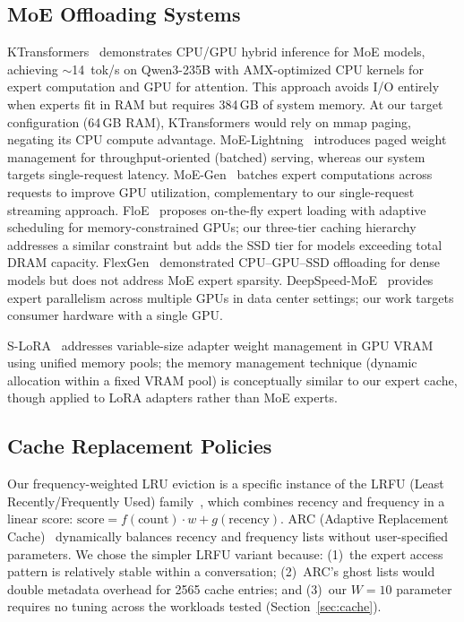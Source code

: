 \documentclass[11pt]{article}
\begin{document}
\subsection{MoE Offloading Systems}

KTransformers~\cite{ktransformers} demonstrates CPU/GPU hybrid inference for MoE models, achieving $\sim$14~tok/s on Qwen3-235B with AMX-optimized CPU kernels for expert computation and GPU for attention. This approach avoids I/O entirely when experts fit in RAM but requires 384\,GB of system memory. At our target configuration (64\,GB RAM), KTransformers would rely on mmap paging, negating its CPU compute advantage. MoE-Lightning~\cite{moelightning} introduces paged weight management for throughput-oriented (batched) serving, whereas our system targets single-request latency. MoE-Gen~\cite{moegen} batches expert computations across requests to improve GPU utilization, complementary to our single-request streaming approach. FloE~\cite{floe} proposes on-the-fly expert loading with adaptive scheduling for memory-constrained GPUs; our three-tier caching hierarchy addresses a similar constraint but adds the SSD tier for models exceeding total DRAM capacity. FlexGen~\cite{flexgen} demonstrated CPU--GPU--SSD offloading for dense models but does not address MoE expert sparsity. DeepSpeed-MoE~\cite{deepspeedmoe} provides expert parallelism across multiple GPUs in data center settings; our work targets consumer hardware with a single GPU.

S-LoRA~\cite{slora} addresses variable-size adapter weight management in GPU VRAM using unified memory pools; the memory management technique (dynamic allocation within a fixed VRAM pool) is conceptually similar to our expert cache, though applied to LoRA adapters rather than MoE experts.

\subsection{Cache Replacement Policies}

Our frequency-weighted LRU eviction is a specific instance of the LRFU (Least Recently/Frequently Used) family~\cite{lrfu}, which combines recency and frequency in a linear score: $\text{score} = f(\text{count}) \cdot w + g(\text{recency})$. ARC (Adaptive Replacement Cache)~\cite{arc} dynamically balances recency and frequency lists without user-specified parameters. We chose the simpler LRFU variant because: (1)~the expert access pattern is relatively stable within a conversation; (2)~ARC's ghost lists would double metadata overhead for 2565 cache entries; and (3)~our $W=10$ parameter requires no tuning across the workloads tested (Section~\ref{sec:cache}).
\end{document}
